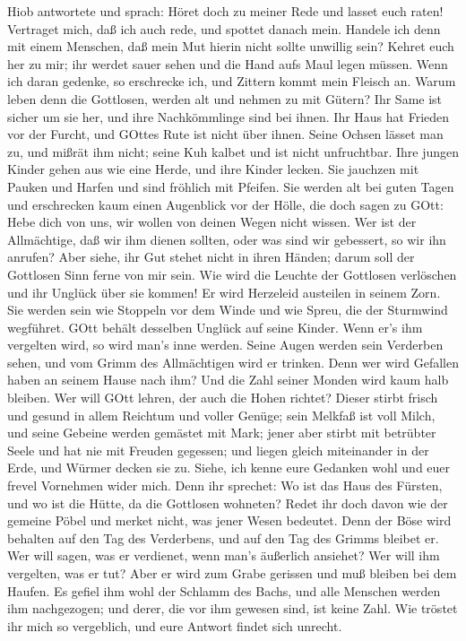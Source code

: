  Hiob antwortete und sprach:  Höret doch zu
meiner Rede und lasset euch raten!  Vertraget mich, daß ich
auch rede, und spottet danach mein.  Handele ich denn mit
einem Menschen, daß mein Mut hierin nicht sollte unwillig sein?
 Kehret euch her zu mir; ihr werdet sauer sehen und die Hand
aufs Maul legen müssen.  Wenn ich daran gedenke, so
erschrecke ich, und Zittern kommt mein Fleisch an.  Warum
leben denn die Gottlosen, werden alt und nehmen zu mit Gütern?
 Ihr Same ist sicher um sie her, und ihre Nachkömmlinge sind
bei ihnen.  Ihr Haus hat Frieden vor der Furcht, und GOttes
Rute ist nicht über ihnen.  Seine Ochsen lässet man zu, und
mißrät ihm nicht; seine Kuh kalbet und ist nicht unfruchtbar.
 Ihre jungen Kinder gehen aus wie eine Herde, und ihre
Kinder lecken.  Sie jauchzen mit Pauken und Harfen und sind
fröhlich mit Pfeifen.  Sie werden alt bei guten Tagen und
erschrecken kaum einen Augenblick vor der Hölle,  die doch
sagen zu GOtt: Hebe dich von uns, wir wollen von deinen Wegen nicht
wissen.  Wer ist der Allmächtige, daß wir ihm dienen
sollten, oder was sind wir gebessert, so wir ihn anrufen? 
Aber siehe, ihr Gut stehet nicht in ihren Händen; darum soll der
Gottlosen Sinn ferne von mir sein.  Wie wird die Leuchte
der Gottlosen verlöschen und ihr Unglück über sie kommen! Er wird
Herzeleid austeilen in seinem Zorn.  Sie werden sein wie
Stoppeln vor dem Winde und wie Spreu, die der Sturmwind wegführet.
 GOtt behält desselben Unglück auf seine Kinder. Wenn er's
ihm vergelten wird, so wird man's inne werden.  Seine Augen
werden sein Verderben sehen, und vom Grimm des Allmächtigen wird er
trinken.  Denn wer wird Gefallen haben an seinem Hause nach
ihm? Und die Zahl seiner Monden wird kaum halb bleiben. 
Wer will GOtt lehren, der auch die Hohen richtet?  Dieser
stirbt frisch und gesund in allem Reichtum und voller Genüge;
 sein Melkfaß ist voll Milch, und seine Gebeine werden
gemästet mit Mark;  jener aber stirbt mit betrübter Seele
und hat nie mit Freuden gegessen;  und liegen gleich
miteinander in der Erde, und Würmer decken sie zu.  Siehe,
ich kenne eure Gedanken wohl und euer frevel Vornehmen wider mich.
 Denn ihr sprechet: Wo ist das Haus des Fürsten, und wo ist
die Hütte, da die Gottlosen wohneten?  Redet ihr doch davon
wie der gemeine Pöbel und merket nicht, was jener Wesen bedeutet.
 Denn der Böse wird behalten auf den Tag des Verderbens,
und auf den Tag des Grimms bleibet er.  Wer will sagen, was
er verdienet, wenn man's äußerlich ansiehet? Wer will ihm vergelten, was
er tut?  Aber er wird zum Grabe gerissen und muß bleiben
bei dem Haufen.  Es gefiel ihm wohl der Schlamm des Bachs,
und alle Menschen werden ihm nachgezogen; und derer, die vor ihm gewesen
sind, ist keine Zahl.  Wie tröstet ihr mich so vergeblich,
und eure Antwort findet sich unrecht.

